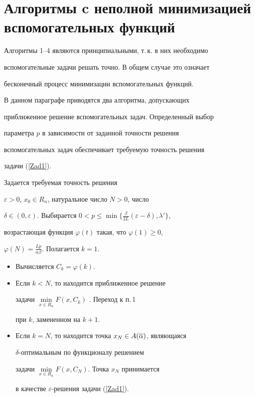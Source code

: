 \section{Алгоритмы c неполной минимизацией вспомогательных функций}





Алгоритмы 1--4 являются принципиальными, т.\,к. в них необходимо 


вспомогательные задачи решать точно. В общем случае это означает 


бесконечный процесс минимизации вспомогательных функций.





В данном параграфе приводятся два алгоритма, допускающих


приближенное решение вспомогательных задач. Определенный выбор


параметра $p$ в зависимости от заданной точности решения


вспомогательных задач обеспечивает требуемую точность решения


задачи (\ref{Zad1}).





\begin{alg}


Задается требуемая точность решения


$\varepsilon>0$, $x_0\in R_n$, натуральное число $N>0$, число


$\delta\in (0,\varepsilon)$. Выбирается $0<


p\leq\min\{\frac{\beta}{2L}(\varepsilon-\delta),\lambda'\}$,


возрастающая функция $\varphi(t)$ такая, что $\varphi(1)\geq 0$,


$\varphi(N)=\frac{Lp}{\overline\alpha\beta}$. Полагается $k=1$.


\begin{itemize}


\item[1.] Вычисляется $C_k=\varphi(k)$.


\item[2.] Если $k<N$, то находится приближенное решение


задачи $\min\limits_{x\in R_n}F(x,C_k)$ . Переход к п.\,1


при $k$, замененном на $k+1$.


\item[3.] Если $k=N$, то находится точка $x_N\in A(\overline\alpha)$, являющаяся 


$\delta$-оптимальным по функционалу решением


задачи $\min\limits_{x\in R_n}F(x,C_N)$. Точка $x_N$ принимается 


в качестве $\varepsilon$-решения задачи (\ref{Zad1}).


\end{itemize}


\end{alg}





